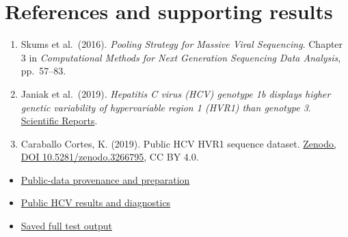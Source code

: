 \hypertarget{references-and-supporting-results}{%
\section{References and supporting
results}\label{references-and-supporting-results}}

\begin{enumerate}
\def\labelenumi{\arabic{enumi}.}
\tightlist
\item
  Skums et al.~(2016). \emph{Pooling Strategy for Massive Viral
  Sequencing}. Chapter 3 in \emph{Computational Methods for Next
  Generation Sequencing Data Analysis}, pp.~57--83.
\item
  Janiak et al.~(2019). \emph{Hepatitis C virus (HCV) genotype 1b
  displays higher genetic variability of hypervariable region 1 (HVR1)
  than genotype 3}.
  \href{https://doi.org/10.1038/s41598-019-49258-y}{Scientific Reports}.
\item
  Caraballo Cortes, K. (2019). Public HCV HVR1 sequence dataset.
  \href{https://doi.org/10.5281/zenodo.3266795}{Zenodo, DOI
  10.5281/zenodo.3266795}, CC BY 4.0.
\end{enumerate}

\begin{itemize}
\tightlist
\item
  \href{https://github.com/trilokpadhi/approx-algorithms-viral-pooling/blob/main/data/public_hcv/README.md}{Public-data
  provenance and preparation}
\item
  \href{https://github.com/trilokpadhi/approx-algorithms-viral-pooling/blob/main/results/public_hcv/report-results.json}{Public
  HCV results and diagnostics}
\item
  \href{https://github.com/trilokpadhi/approx-algorithms-viral-pooling/blob/main/results/verification.txt}{Saved
  full test output}
\end{itemize}
